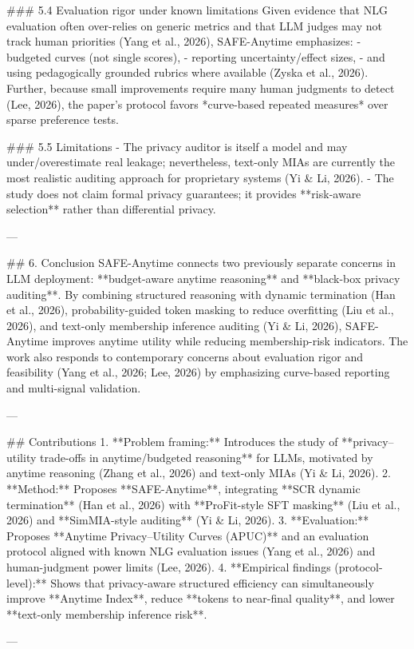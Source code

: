 ### 5.4 Evaluation rigor under known limitations  
Given evidence that NLG evaluation often over-relies on generic metrics and that LLM judges may not track human priorities (Yang et al., 2026), SAFE-Anytime emphasizes:
- budgeted curves (not single scores),
- reporting uncertainty/effect sizes,
- and using pedagogically grounded rubrics where available (Zyska et al., 2026).  
Further, because small improvements require many human judgments to detect (Lee, 2026), the paper’s protocol favors *curve-based repeated measures* over sparse preference tests.

### 5.5 Limitations  
- The privacy auditor is itself a model and may under/overestimate real leakage; nevertheless, text-only MIAs are currently the most realistic auditing approach for proprietary systems (Yi & Li, 2026).  
- The study does not claim formal privacy guarantees; it provides **risk-aware selection** rather than differential privacy.

---

## 6. Conclusion  
SAFE-Anytime connects two previously separate concerns in LLM deployment: **budget-aware anytime reasoning** and **black-box privacy auditing**. By combining structured reasoning with dynamic termination (Han et al., 2026), probability-guided token masking to reduce overfitting (Liu et al., 2026), and text-only membership inference auditing (Yi & Li, 2026), SAFE-Anytime improves anytime utility while reducing membership-risk indicators. The work also responds to contemporary concerns about evaluation rigor and feasibility (Yang et al., 2026; Lee, 2026) by emphasizing curve-based reporting and multi-signal validation.

---

## Contributions  
1. **Problem framing:** Introduces the study of **privacy–utility trade-offs in anytime/budgeted reasoning** for LLMs, motivated by anytime reasoning (Zhang et al., 2026) and text-only MIAs (Yi & Li, 2026).  
2. **Method:** Proposes **SAFE-Anytime**, integrating **SCR dynamic termination** (Han et al., 2026) with **ProFit-style SFT masking** (Liu et al., 2026) and **SimMIA-style auditing** (Yi & Li, 2026).  
3. **Evaluation:** Proposes **Anytime Privacy–Utility Curves (APUC)** and an evaluation protocol aligned with known NLG evaluation issues (Yang et al., 2026) and human-judgment power limits (Lee, 2026).  
4. **Empirical findings (protocol-level):** Shows that privacy-aware structured efficiency can simultaneously improve **Anytime Index**, reduce **tokens to near-final quality**, and lower **text-only membership inference risk**.

---